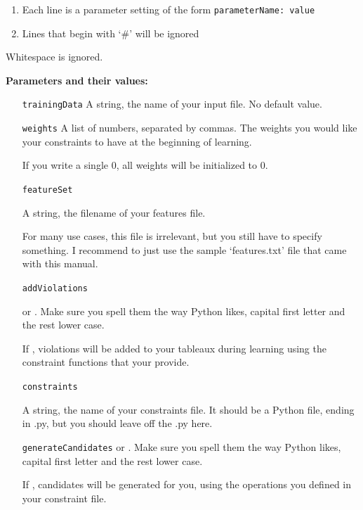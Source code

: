 \documentclass[12]{article}
\begin{document}
\begin{enumerate}
	\item Each line is a parameter setting of the form \texttt{parameterName: value}
	\item Lines that begin with `\#' will be ignored
\end{enumerate}

Whitespace is ignored.

{\bf Parameters and their values:}

\begin{itemize}
	\item[\texttt{trainingData}] 
	A string, the name of your input file.  No default value.
	
	\item[\texttt{weights}] A list of numbers, separated by commas.  The weights you would like your constraints to have at the beginning of learning.
	
	If you write a single 0, all weights will be initialized to 0.
	
	\item[\texttt{featureSet}]
	
	A string, the filename of your features file.
	
	For many use cases, this file is irrelevant, but you still have to specify something.  I recommend to just use the sample `features.txt' file that came with this manual.
	
	\item[\texttt{addViolations}]
	
	 or .  Make sure you spell them the way Python likes, capital first letter and the rest lower case.
	
	If , violations will be added to your tableaux during learning using the constraint functions that your provide.
	
	\item[\texttt{constraints}]
	
	A string, the name of your constraints file.  It should be a Python file, ending in .py, but you should leave off the .py here.
	
	\item[\texttt{generateCandidates}]
	 or .  Make sure you spell them the way Python likes, capital first letter and the rest lower case.
	
	If , candidates will be generated for you, using the operations you defined in your constraint file.
	

\end{itemize}
\end{document}
